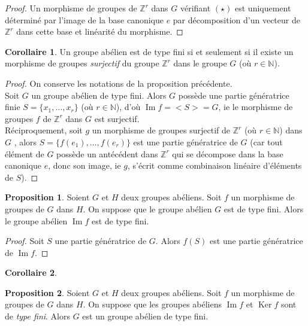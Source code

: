 \documentclass{article}
\newcommand{\Z}{\mathbb{Z}}
\newcommand{\N}{\mathbb{N}}
\newcommand{\im}{\mathop{\mathrm{Im}}\nolimits}
\renewcommand{\ker}{\mathop{\mathrm{Ker}}\nolimits}
\theoremstyle{definition}
\newtheorem{prop}{Proposition}
\newtheorem{coro}{Corollaire}
\theoremstyle{remark}
\begin{document}
\begin{proof}
Un morphisme de groupes de $\Z^r$ dans $G$ vérifiant $(\star)$ est uniquement déterminé par l'image de la base canonique $e$ par décomposition d'un vecteur de $\Z^r$ dans cette base et linéarité du morphisme.
\end{proof}

\begin{coro}
Un groupe abélien est de type fini si et seulement si il existe un morphisme de groupes \textit{surjectif} du groupe $\Z^r$ dans le groupe $G$ (où $r \in \N$).
\end{coro}

\begin{proof}
On conserve les notations de la proposition précédente. \\
Soit $G$ un groupe abélien de type fini. Alors $G$ possède une partie génératrice finie $S=\{x_1, \ldots, x_r \}$ (où $r \in \N$), d'où $\im f=<S>=G$, ie le morphisme de groupes $f$ de $\Z^r$ dans $G$ est surjectif. \\
Réciproquement, soit $g$ un morphisme de groupes surjectif de $\Z^r$ (où $r \in \N$) dans $G$ , alors $S=\{f(e_1), \ldots, f(e_r) \}$ est une partie génératrice de $G$ (car tout élément de $G$ possède un antécédent dans $\Z^r$ qui se décompose dans la base canonique $e$, donc son image, ie $g$, s'écrit comme combinaison linéaire d'éléments de $S$). 
\end{proof}

\begin{prop}
Soient $G$ et $H$ deux groupes abéliens. Soit $f$ un morphisme de groupes de $G$ dans $H$. On suppose que le groupe abélien $G$ est de type fini. Alors le groupe abélien $\im f$ est de type fini.
\end{prop}

\begin{proof}
Soit $S$ une partie génératrice de $G$. Alors $f(S)$ est une partie génératrice de $\im f$.
\end{proof}

\begin{coro}

\end{coro}

\begin{prop}
Soient $G$ et $H$ deux groupes abéliens. Soit $f$ un morphisme de groupes de $G$ dans $H$. On suppose que les groupes abéliens $\im f$ et $\ker f$ sont de \textit{type fini}. Alors $G$ est un groupe abélien de type fini.
\end{prop}
\end{document}
